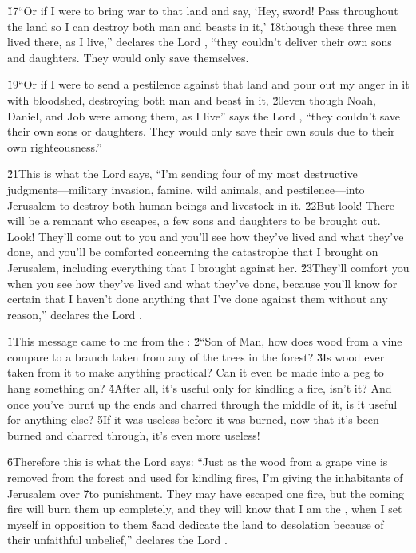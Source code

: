 \v{17}``Or if I were to bring war to that land and say, `Hey, sword! Pass throughout the land so I can destroy both man and beasts in it,' \v{18}though these three men lived there, as I live,'' declares the Lord , ``they couldn't deliver their own sons and daughters. They would only save themselves.

\v{19}``Or if I were to send a pestilence against that land and pour out my anger in it with bloodshed, destroying both man and beast in it, \v{20}even though Noah, Daniel, and Job were among them, as I live'' says the Lord , ``they couldn't save their own sons or daughters. They would only save their own souls due to their own righteousness.''

\v{21}This is what the Lord  says, ``I'm sending four of my most destructive judgments---military invasion, famine, wild animals, and pestilence---into Jerusalem to destroy both human beings and livestock in it. \v{22}But look! There will be a remnant who escapes, a few sons and daughters to be brought out. Look! They'll come out to you and you'll see how they've lived and what they've done, and you'll be comforted concerning the catastrophe that I brought on Jerusalem, including everything that I brought against her. \v{23}They'll comfort you when you see how they've lived and what they've done, because you'll know for certain that I haven't done anything that I've done against them without any reason,'' declares the Lord .

\v{1}This message came to me from the : \v{2}``Son of Man, how does wood from a vine compare to a branch taken from any of the trees in the forest? \v{3}Is wood ever taken from it to make anything practical? Can it even be made into a peg to hang something on? \v{4}After all, it's useful only for kindling a fire, isn't it? And once you've burnt up the ends and charred through the middle of it, is it useful for anything else? \v{5}If it was useless before it was burned, now that it's been burned and charred through, it's even more useless!

\v{6}Therefore this is what the Lord  says: ``Just as the wood from a grape vine is removed from the forest and used for kindling fires, I'm giving the inhabitants of Jerusalem over \v{7}to punishment. They may have escaped one fire, but the coming fire will burn them up completely, and they will know that I am the , when I set myself in opposition to them \v{8}and dedicate the land to desolation because of their unfaithful unbelief,'' declares the Lord .

